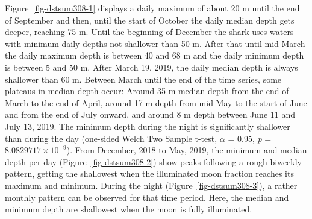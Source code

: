\documentclass[
  authoryear,
  review,
  3p]{elsarticle}
\begin{document}
Figure~\ref{fig-dstsum308-1} displays a daily maximum of about 20 m
until the end of September and then, until the start of October the
daily median depth gets deeper, reaching 75 m. Until the beginning of
December the shark uses waters with minimum daily depths not shallower
than 50 m. After that until mid March the daily maximum depth is between
40 and 68 m and the daily minimum depth is between 5 and 50 m. After
March 19, 2019, the daily median depth is always shallower than 60 m.
Between March until the end of the time series, some plateaus in median
depth occur: Around 35 m median depth from the end of March to the end
of April, around 17 m depth from mid May to the start of June and from
the end of July onward, and around 8 m depth between June 11 and July
13, 2019. The minimum depth during the night is significantly shallower
than during the day (one-sided Welch Two Sample t-test, \(\alpha\) =
0.95, \emph{p} = \ensuremath{8.0829717\times 10^{-9}}). From December,
2018 to May, 2019, the minimum and median depth per day
(Figure~\ref{fig-dstsum308-2}) show peaks following a rough biweekly
pattern, getting the shallowest when the illuminated moon fraction
reaches its maximum and minimum. During the night
(Figure~\ref{fig-dstsum308-3}), a rather monthly pattern can be observed
for that time period. Here, the median and minimum depth are shallowest
when the moon is fully illuminated.
\end{document}
